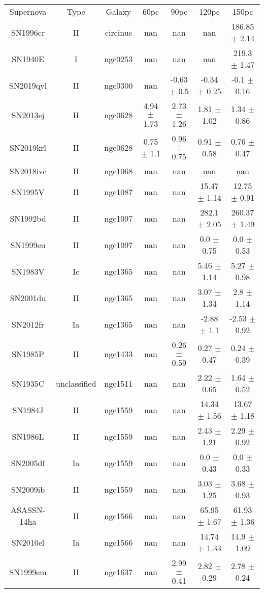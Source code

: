 \begin{table}
\begin{tabular}{ccccccc}
Supernova & Type & Galaxy & 60pc & 90pc & 120pc & 150pc \\
SN1996cr & II & circinus & nan & nan & nan & 186.85 $\pm$ 2.14 \\
SN1940E & I & ngc0253 & nan & nan & nan & 219.3 $\pm$ 1.47 \\
SN2019qyl & II & ngc0300 & nan & -0.63 $\pm$ 0.5 & -0.34 $\pm$ 0.25 & -0.1 $\pm$ 0.16 \\
SN2013ej & II & ngc0628 & 4.94 $\pm$ 1.73 & 2.73 $\pm$ 1.26 & 1.81 $\pm$ 1.02 & 1.34 $\pm$ 0.86 \\
SN2019krl & II & ngc0628 & 0.75 $\pm$ 1.1 & 0.96 $\pm$ 0.75 & 0.91 $\pm$ 0.58 & 0.76 $\pm$ 0.47 \\
SN2018ivc & II & ngc1068 & nan & nan & nan & nan \\
SN1995V & II & ngc1087 & nan & nan & 15.47 $\pm$ 1.14 & 12.75 $\pm$ 0.91 \\
SN1992bd & II & ngc1097 & nan & nan & 282.1 $\pm$ 2.05 & 260.37 $\pm$ 1.49 \\
SN1999eu & II & ngc1097 & nan & nan & 0.0 $\pm$ 0.75 & 0.0 $\pm$ 0.53 \\
SN1983V & Ic & ngc1365 & nan & nan & 5.46 $\pm$ 1.14 & 5.27 $\pm$ 0.98 \\
SN2001du & II & ngc1365 & nan & nan & 3.07 $\pm$ 1.34 & 2.8 $\pm$ 1.14 \\
SN2012fr & Ia & ngc1365 & nan & nan & -2.88 $\pm$ 1.1 & -2.53 $\pm$ 0.92 \\
SN1985P & II & ngc1433 & nan & 0.26 $\pm$ 0.59 & 0.27 $\pm$ 0.47 & 0.24 $\pm$ 0.39 \\
SN1935C & unclassified & ngc1511 & nan & nan & 2.22 $\pm$ 0.65 & 1.64 $\pm$ 0.52 \\
SN1984J & II & ngc1559 & nan & nan & 14.34 $\pm$ 1.56 & 13.67 $\pm$ 1.18 \\
SN1986L & II & ngc1559 & nan & nan & 2.43 $\pm$ 1.21 & 2.29 $\pm$ 0.92 \\
SN2005df & Ia & ngc1559 & nan & nan & 0.0 $\pm$ 0.43 & 0.0 $\pm$ 0.33 \\
SN2009ib & II & ngc1559 & nan & nan & 3.03 $\pm$ 1.25 & 3.68 $\pm$ 0.93 \\
ASASSN-14ha & II & ngc1566 & nan & nan & 65.95 $\pm$ 1.67 & 61.93 $\pm$ 1.36 \\
SN2010el & Ia & ngc1566 & nan & nan & 14.74 $\pm$ 1.33 & 14.9 $\pm$ 1.09 \\
SN1999em & II & ngc1637 & nan & 2.99 $\pm$ 0.41 & 2.82 $\pm$ 0.29 & 2.78 $\pm$ 0.24 \\

\end{tabular}
\end{table}
